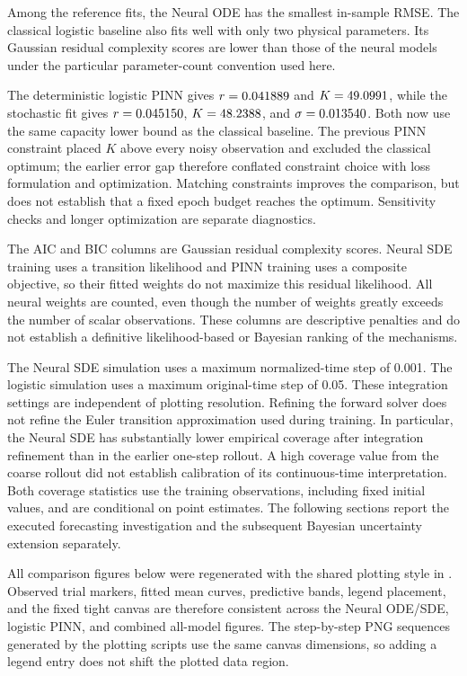 

Among the reference fits, the Neural ODE has the smallest in-sample RMSE. The classical
logistic baseline also fits well with only two physical parameters. Its
Gaussian residual complexity scores are lower than those of the neural
models under the particular parameter-count convention used here.

The deterministic logistic PINN gives $r=0.041889$ and $K=49.0991$, while the
stochastic fit gives $r=0.045150$, $K=48.2388$, and $\sigma=0.013540$.
Both now use the same capacity lower bound as the classical baseline. The
previous PINN constraint placed $K$ above every noisy observation and excluded
the classical optimum; the earlier error gap therefore conflated constraint
choice with loss formulation and optimization. Matching constraints improves
the comparison, but does not establish that a fixed epoch budget reaches the
optimum. Sensitivity checks and longer optimization are separate diagnostics.

The AIC and BIC columns are Gaussian residual complexity scores. Neural SDE
training uses a transition likelihood and PINN training uses a composite
objective, so their fitted weights do not maximize this residual likelihood.
All neural weights are counted, even though the number of weights greatly
exceeds the number of scalar observations. These columns are descriptive
penalties and do not establish a definitive likelihood-based or Bayesian
ranking of the mechanisms.

The Neural SDE simulation uses a maximum normalized-time step of 0.001.
The logistic simulation uses a maximum original-time step of 0.05. These
integration settings are independent of plotting resolution. Refining the
forward solver does not refine the Euler transition approximation used during
training. In particular, the Neural SDE has substantially lower empirical
coverage after integration refinement than in the earlier one-step rollout.
A high coverage value from the coarse rollout did not establish calibration
of its continuous-time interpretation. Both coverage statistics use the
training observations, including fixed initial values, and are conditional on
point estimates. The following sections report the executed forecasting
investigation and the subsequent Bayesian uncertainty extension separately.

All comparison figures below were regenerated with the shared plotting style in
. Observed trial markers, fitted mean
curves, predictive bands, legend placement, and the fixed tight canvas are
therefore consistent across the Neural ODE/SDE, logistic PINN, and combined
all-model figures. The step-by-step PNG sequences generated by the plotting
scripts use the same canvas dimensions, so adding a legend entry does not
shift the plotted data region.

